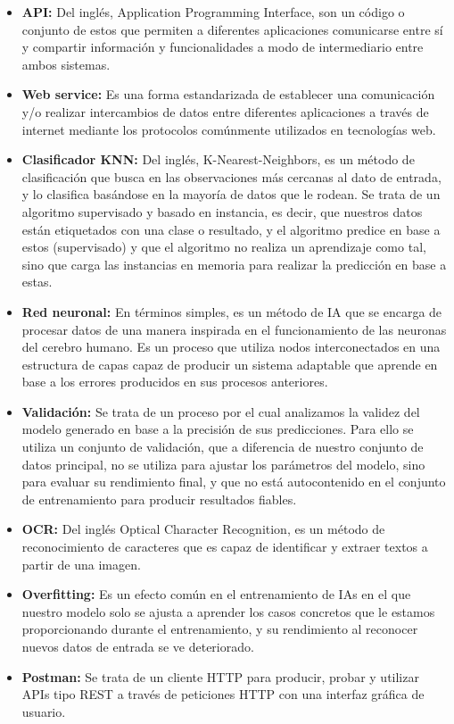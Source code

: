 \documentclass{article}
\begin{document}
\begin{itemize}
	\item \textbf{API:} Del inglés, Application Programming Interface, son un código o conjunto de estos que permiten a diferentes aplicaciones comunicarse entre sí y compartir información y funcionalidades a modo de intermediario entre ambos sistemas.
	\item \textbf{Web service:} Es una forma estandarizada de establecer una comunicación y/o realizar intercambios de datos entre diferentes aplicaciones a través de internet mediante los protocolos comúnmente utilizados en tecnologías web.
	\item \textbf{Clasificador KNN:} Del inglés, K-Nearest-Neighbors, es un método de clasificación que busca en las observaciones más cercanas al dato de entrada, y lo clasifica basándose en la mayoría de datos que le rodean. Se trata de un algoritmo supervisado y basado en instancia, es decir, que nuestros datos están etiquetados con una clase o resultado, y el algoritmo predice en base a estos (supervisado) y que el algoritmo no realiza un aprendizaje como tal, sino que carga las instancias en memoria para realizar la predicción en base a estas.
	\item \textbf{Red neuronal:} En términos simples, es un método de IA que se encarga de procesar datos de una manera inspirada en el funcionamiento de las neuronas del cerebro humano. Es un proceso que utiliza nodos interconectados en una estructura de capas capaz de producir un sistema adaptable que aprende en base a los errores producidos en sus procesos anteriores.
	\item \textbf{Validación:} Se trata de un proceso por el cual analizamos la validez del modelo generado en base a la precisión de sus predicciones. Para ello se utiliza un conjunto de validación, que a diferencia de nuestro conjunto de datos principal, no se utiliza para ajustar los parámetros del modelo, sino para evaluar su rendimiento final, y que no está autocontenido en el conjunto de entrenamiento para producir resultados fiables.
	\item \textbf{OCR:} Del inglés Optical Character Recognition, es un método de reconocimiento de caracteres que es capaz de identificar y extraer textos a partir de una imagen.
	\item \textbf{Overfitting:} Es un efecto común en el entrenamiento de IAs en el que nuestro modelo solo se ajusta a aprender los casos concretos que le estamos proporcionando durante el entrenamiento, y su rendimiento al reconocer nuevos datos de entrada se ve deteriorado.
	\item \textbf{Postman:} Se trata de un cliente HTTP para producir, probar y utilizar APIs tipo REST a través de peticiones HTTP con una interfaz gráfica de usuario.

\end{itemize}
\end{document}
